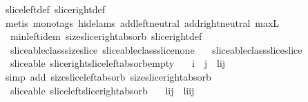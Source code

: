 \begin{isabellebody}
\ slice{\isacharunderscore}left{\isacharunderscore}def\ slice{\isacharunderscore}right{\isacharunderscore}def\isanewline
{}\isamarkupfalse%
\ {\isacharparenleft}metis\ {\isacharparenleft}mono{\isacharunderscore}tags{\isacharcomma}\ hide{\isacharunderscore}lams{\isacharparenright}\ add{\isachardot}left{\isacharunderscore}neutral\ add{\isachardot}right{\isacharunderscore}neutral\ max{\isacharunderscore}{}L\ \isanewline
\ \ min{\isachardot}left{\isacharunderscore}idem\ size{\isacharunderscore}slice{\isacharunderscore}right{\isacharunderscore}absorb\ slice{\isacharunderscore}right{\isacharunderscore}def\ \isanewline
\ \ sliceable{\isacharunderscore}class{\isachardot}size{\isacharunderscore}slice\ sliceable{\isacharunderscore}class{\isachardot}slice{\isacharunderscore}none\ \isanewline
\ \ sliceable{\isacharunderscore}class{\isachardot}slice{\isacharunderscore}slice{\isacharparenright}%
\endisatagproof
{\isafoldproof}%
%
\isadelimproof
\isanewline
%
\endisadelimproof
\isanewline
{}\isamarkupfalse%
\ {\isacharparenleft}\ sliceable{\isacharparenright}\ slice{\isacharunderscore}right{\isacharunderscore}slice{\isacharunderscore}left{\isacharunderscore}absorb{\isacharunderscore}empty{\isacharcolon}\ \isanewline
\ \ {\isachardoublequoteopen}i\ {\isasymle}\ j\ {\isasymLongrightarrow}\ {\isacharparenleft}{\isacharhash}{\isacharparenleft}{\isacharparenleft}l{\isasymdagger}{\isachardot}{\isachardot}i{\isacharparenright}{\isasymdagger}j{\isachardot}{\isachardot}{\isacharparenright}{\isacharparenright}\ {\isacharequal}\ {}{\isachardoublequoteclose}\isanewline
%
\isadelimproof
%
\endisadelimproof
%
\isatagproof
{}\isamarkupfalse%
\ {\isacharparenleft}simp\ add{\isacharcolon}\ size{\isacharunderscore}slice{\isacharunderscore}left{\isacharunderscore}absorb\ size{\isacharunderscore}slice{\isacharunderscore}right{\isacharunderscore}absorb{\isacharparenright}%
\endisatagproof
{\isafoldproof}%
%
\isadelimproof
\isanewline
%
\endisadelimproof
\isanewline
{}\isamarkupfalse%
\ {\isacharparenleft}\ sliceable{\isacharparenright}\ slice{\isacharunderscore}left{\isacharunderscore}slice{\isacharunderscore}right{\isacharunderscore}absorb{\isacharcolon}\ \isanewline
\ \ {\isachardoublequoteopen}{\isacharparenleft}l{\isasymdagger}i{\isachardot}{\isachardot}{\isacharparenright}{\isasymdagger}{\isachardot}{\isachardot}j\ {\isacharequal}\ l{\isasymdagger}i{\isachardot}{\isachardot}{\isacharparenleft}i{\isacharplus}j{\isacharparenright}{\isachardoublequoteclose}\isanewline
%

\end{isabellebody}
